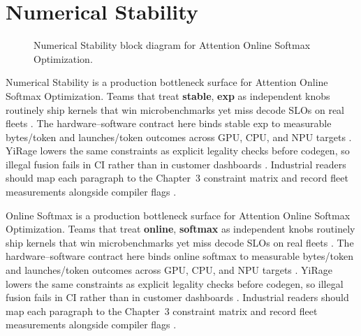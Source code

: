 \section{Numerical Stability}
\label{sec:numerical_stability}
\begin{figure}[t]
\centering
{}
\caption{Numerical Stability block diagram for Attention Online Softmax Optimization.}
\label{fig:numerical_stability_architecture}
\end{figure}


Numerical Stability is a production bottleneck surface for Attention Online Softmax Optimization. Teams that treat \textbf{stable}, \textbf{exp} as independent knobs routinely ship kernels that win microbenchmarks yet miss decode SLOs on real fleets \citep{taxbreak2026,semianalysis2024tma}. The hardware--software contract here binds stable exp to measurable bytes/token and launches/token outcomes across GPU, CPU, and NPU targets \citep{memoryfloor2026,amd2024xdna}. YiRage lowers the same constraints as explicit legality checks before codegen, so illegal fusion fails in CI rather than in customer dashboards \citep{nvidia2022hopper,amd2024aie}. Industrial readers should map each paragraph to the Chapter~3 constraint matrix and record fleet measurements alongside compiler flags \citep{semianalysis2024tma,dlbook}.

Online Softmax is a production bottleneck surface for Attention Online Softmax Optimization. Teams that treat \textbf{online}, \textbf{softmax} as independent knobs routinely ship kernels that win microbenchmarks yet miss decode SLOs on real fleets \citep{liu2024deepseekv3,memoryfloor2026}. The hardware--software contract here binds online softmax to measurable bytes/token and launches/token outcomes across GPU, CPU, and NPU targets \citep{patel2025llminference,nvidia2022hopper}. YiRage lowers the same constraints as explicit legality checks before codegen, so illegal fusion fails in CI rather than in customer dashboards \citep{taxbreak2026,semianalysis2024tma}. Industrial readers should map each paragraph to the Chapter~3 constraint matrix and record fleet measurements alongside compiler flags \citep{memoryfloor2026,amd2024xdna}.

